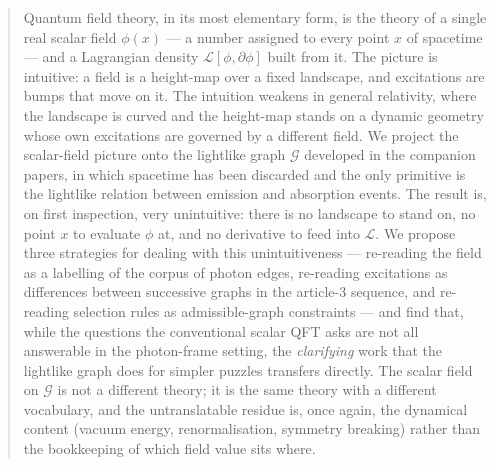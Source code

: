 \documentclass[11pt]{article}
\begin{document}
\begin{abstract}
Quantum field theory, in its most elementary form, is the theory of a single real scalar field $\phi(x)$ --- a number assigned to every point $x$ of spacetime --- and a Lagrangian density $\mathcal{L}[\phi, \partial\phi]$ built from it. The picture is intuitive: a field is a height-map over a fixed landscape, and excitations are bumps that move on it. The intuition weakens in general relativity, where the landscape is curved and the height-map stands on a dynamic geometry whose own excitations are governed by a different field. We project the scalar-field picture onto the lightlike graph $\mathcal{G}$ developed in the companion papers, in which spacetime has been discarded and the only primitive is the lightlike relation between emission and absorption events. The result is, on first inspection, very unintuitive: there is no landscape to stand on, no point $x$ to evaluate $\phi$ at, and no derivative to feed into $\mathcal{L}$. We propose three strategies for dealing with this unintuitiveness --- re-reading the field as a labelling of the corpus of photon edges, re-reading excitations as differences between successive graphs in the article-3 sequence, and re-reading selection rules as admissible-graph constraints --- and find that, while the questions the conventional scalar QFT asks are not all answerable in the photon-frame setting, the \emph{clarifying} work that the lightlike graph does for simpler puzzles transfers directly. The scalar field on $\mathcal{G}$ is not a different theory; it is the same theory with a different vocabulary, and the untranslatable residue is, once again, the dynamical content (vacuum energy, renormalisation, symmetry breaking) rather than the bookkeeping of which field value sits where.
\end{abstract}
\end{document}
